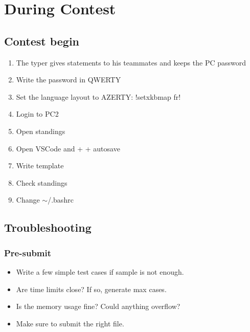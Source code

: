 \chapter{ During Contest }

\section{ Contest begin }

\begin{enumerate}[topsep=0pt, partopsep=0pt, itemsep=2pt, parsep=0pt, left=0pt]
   \item The typer gives statements to his teammates and keeps the PC password
   \item Write the password in QWERTY
   \item Set the language layout to AZERTY: \inlinecode!setxkbmap fr!
   \item Login to PC2
   \item Open standings
   \item Open VSCode and  +  +  autosave
   \item Write template 
   \item Check standings
   \item Change $\sim$/.bashrc 
\end{enumerate}

\section{ Troubleshooting }
\subsection{ Pre-submit }
\begin{itemize}[topsep=0pt, partopsep=0pt, itemsep=2pt, parsep=0pt, left=0pt]
   \item Write a few simple test cases if sample is not enough.
   \item Are time limits close? If so, generate max cases.
   \item Is the memory usage fine? Could anything overflow?
   \item Make sure to submit the right file.
\end{itemize}

